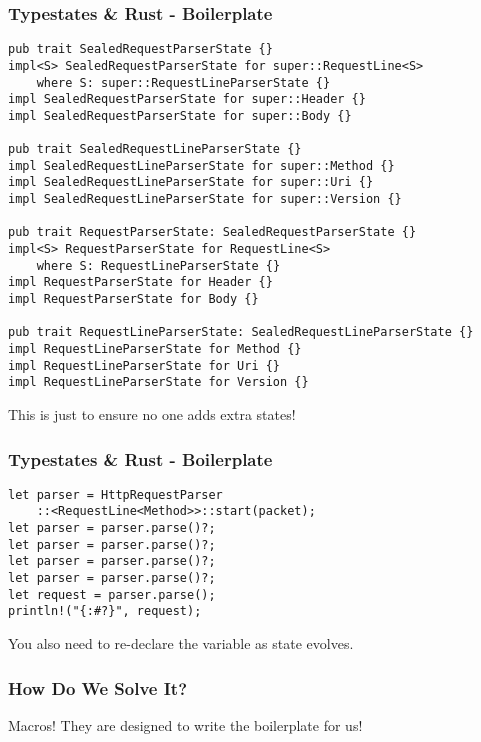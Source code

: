 \documentclass[notes]{beamer}
\begin{document}
\begin{frame}[fragile, label={boilerplate-1}]
    \frametitle{Typestates \& Rust - Boilerplate}

    \begin{lstlisting}[basicstyle=\tiny]
pub trait SealedRequestParserState {}
impl<S> SealedRequestParserState for super::RequestLine<S>
    where S: super::RequestLineParserState {}
impl SealedRequestParserState for super::Header {}
impl SealedRequestParserState for super::Body {}

pub trait SealedRequestLineParserState {}
impl SealedRequestLineParserState for super::Method {}
impl SealedRequestLineParserState for super::Uri {}
impl SealedRequestLineParserState for super::Version {}

pub trait RequestParserState: SealedRequestParserState {}
impl<S> RequestParserState for RequestLine<S>
    where S: RequestLineParserState {}
impl RequestParserState for Header {}
impl RequestParserState for Body {}

pub trait RequestLineParserState: SealedRequestLineParserState {}
impl RequestLineParserState for Method {}
impl RequestLineParserState for Uri {}
impl RequestLineParserState for Version {}
    \end{lstlisting}
    \alert{This is just to ensure no one adds extra states!}
\end{frame}

\begin{frame}[fragile, label={boilerplate-2}]
    \frametitle{Typestates \& Rust - Boilerplate}

    \begin{lstlisting}
let parser = HttpRequestParser
    ::<RequestLine<Method>>::start(packet);
let parser = parser.parse()?;
let parser = parser.parse()?;
let parser = parser.parse()?;
let parser = parser.parse()?;
let request = parser.parse();
println!("{:#?}", request);
    \end{lstlisting}
    \alert{You also need to re-declare the variable as state evolves.}
\end{frame}

\begin{frame}[fragile]
    \frametitle{How Do We Solve It?}
    Macros! They are designed to write the boilerplate for us!

\end{frame}
\end{document}
